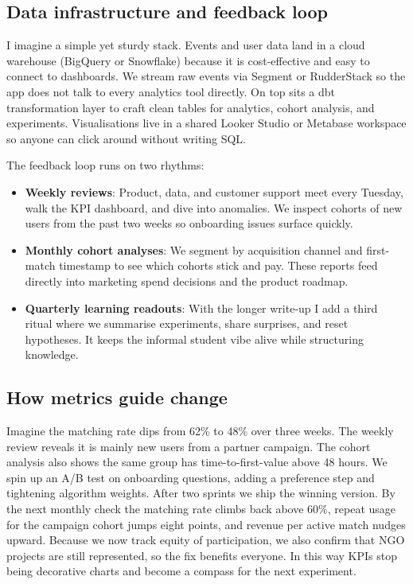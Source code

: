\subsection*{Data infrastructure and feedback loop}
I imagine a simple yet sturdy stack. Events and user data land in a cloud warehouse (BigQuery or Snowflake) because it is cost-effective and easy to connect to dashboards. We stream raw events via Segment or RudderStack so the app does not talk to every analytics tool directly. On top sits a dbt transformation layer to craft clean tables for analytics, cohort analysis, and experiments. Visualisations live in a shared Looker Studio or Metabase workspace so anyone can click around without writing SQL.

The feedback loop runs on two rhythms:
\begin{itemize}
    \item \textbf{Weekly reviews}: Product, data, and customer support meet every Tuesday, walk the KPI dashboard, and dive into anomalies. We inspect cohorts of new users from the past two weeks so onboarding issues surface quickly.
    \item \textbf{Monthly cohort analyses}: We segment by acquisition channel and first-match timestamp to see which cohorts stick and pay. These reports feed directly into marketing spend decisions and the product roadmap.
    \item \textbf{Quarterly learning readouts}: With the longer write-up I add a third ritual where we summarise experiments, share surprises, and reset hypotheses. It keeps the informal student vibe alive while structuring knowledge.
\end{itemize}

\subsection*{How metrics guide change}
Imagine the matching rate dips from 62\% to 48\% over three weeks. The weekly review reveals it is mainly new users from a partner campaign. The cohort analysis also shows the same group has time-to-first-value above 48 hours. We spin up an A/B test on onboarding questions, adding a preference step and tightening algorithm weights. After two sprints we ship the winning version. By the next monthly check the matching rate climbs back above 60\%, repeat usage for the campaign cohort jumps eight points, and revenue per active match nudges upward. Because we now track equity of participation, we also confirm that NGO projects are still represented, so the fix benefits everyone. In this way KPIs stop being decorative charts and become a compass for the next experiment.
